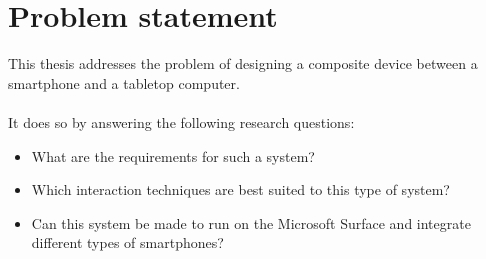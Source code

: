 %
%
%
%
%
%
%
%
%
%
%


%

\section{Problem statement}

This thesis addresses the problem of designing a composite device between a smartphone and a tabletop computer.
\\\\
It does so by answering the following research questions:
\begin{itemize}
\item What are the requirements for such a system?
\item Which interaction techniques are best suited to this type of system?
\item Can this system be made to run on the Microsoft Surface and integrate different types of smartphones?
\end{itemize}

